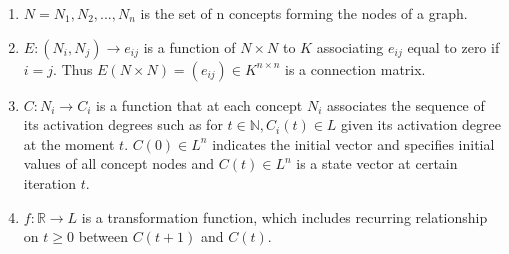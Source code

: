 \documentclass[conference]{IEEEtran}
\begin{document}
\begin{enumerate}
\item \begin{math} N = {N_{1},N_{2},...,N_{n}} \end{math} is the set of n concepts forming the nodes of a graph.
\item \begin{math} E: (N_{i},N_{j}) \rightarrow e_{ij} \end{math} is a function of \begin{math} N \times N \end{math} to \begin{math} K \end{math} associating \begin{math} e_{ij} \end{math} equal to zero if \begin{math} i = j \end{math}. Thus \begin{math} E(N \times N) = (e_{ij}) \in K^{n \times n} \end{math} is a connection matrix.
\item \begin{math} C: N_{i} \rightarrow C_{i} \end{math} is a function that at each concept \begin{math} N_{i} \end{math} associates the sequence of its activation degrees such as for \begin{math} t \in \mathbb{N}, C_{i}(t) \in L \end{math} given its activation degree at the moment \begin{math} t \end{math}. \begin{math} C(0) \in L^{n} \end{math} indicates the initial vector and specifies initial values of all concept nodes and \begin{math} C(t) \in L^{n} \end{math} is a state vector at certain iteration \begin{math} t \end{math}.
\item \begin{math} f: \mathbb{R} \rightarrow L \end{math} is a transformation function, which includes recurring relationship on \begin{math} t \geqslant 0 \end{math} between \begin{math} C(t+1) \end{math} and \begin{math} C(t) \end{math}.
\end{enumerate}
\end{document}
